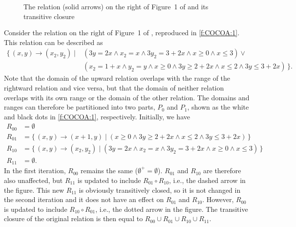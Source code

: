 \begin{figure}
\begin{center}
\end{center}
\caption{The relation (solid arrows) on the right of Figure~1 of
\protect\textcite{Beletska2009} and its transitive closure}
\label{f:COCOA:1}
\end{figure}
\begin{example}
Consider the relation on the right of Figure~1 of
\textcite{Beletska2009},
reproduced in \autoref{f:COCOA:1}.
This relation can be described as
$$
\begin{aligned}
\{\, (x, y) \to (x_2, y_2) \mid {} & (3y = 2x \wedge x_2 = x \wedge 3y_2 = 3 + 2x \wedge x \ge 0 \wedge x \le 3) \vee {} \\
& (x_2 = 1 + x \wedge y_2 = y \wedge x \ge 0 \wedge 3y \ge 2 + 2x \wedge x \le 2 \wedge 3y \le 3 + 2x) \,\}
.
\end{aligned}
$$
Note that the domain of the upward relation overlaps with the range
of the rightward relation and vice versa, but that the domain
of neither relation overlaps with its own range or the domain of
the other relation.
The domains and ranges can therefore be partitioned into two parts,
$P_0$ and $P_1$, shown as the white and black dots in \autoref{f:COCOA:1},
respectively.
Initially, we have
$$
\begin{aligned}
R_{00} & = \emptyset
\\
R_{01} & = 
\{\, (x, y) \to (x+1, y) \mid 
(x \ge 0 \wedge 3y \ge 2 + 2x \wedge x \le 2 \wedge 3y \le 3 + 2x) \,\}
\\
R_{10} & =
\{\, (x, y) \to (x_2, y_2) \mid (3y = 2x \wedge x_2 = x \wedge 3y_2 = 3 + 2x \wedge x \ge 0 \wedge x \le 3) \,\}
\\
R_{11} & = \emptyset
.
\end{aligned}
$$
In the first iteration, $R_{00}$ remains the same ($\emptyset^+ = \emptyset$).
$R_{01}$ and $R_{10}$ are therefore also unaffected, but
$R_{11}$ is updated to include $R_{01} \circ R_{10}$, i.e.,
the dashed arrow in the figure.
This new $R_{11}$ is obviously transitively closed, so it is not
changed in the second iteration and it does not have an effect
on $R_{01}$ and $R_{10}$.  However, $R_{00}$ is updated to
include $R_{10} \circ R_{01}$, i.e., the dotted arrow in the figure.
The transitive closure of the original relation is then equal to
$R_{00} \cup R_{01} \cup R_{10} \cup R_{11}$.
\end{example}

